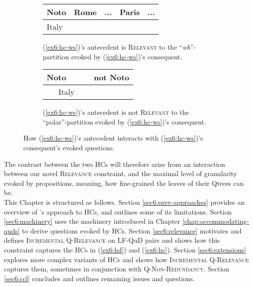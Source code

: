 \begin{figure}[H]
	\centering
	\begin{subfigure}[t]{.47\linewidth}
		\centering
		\begin{tabular}{|lll|ll}
			\hline
			\multicolumn{1}{|l|}{Noto} & \multicolumn{1}{l|}{Rome} & ... & \multicolumn{1}{l|}{Paris} & \multicolumn{1}{l|}{...} \\ \hline
			\multicolumn{3}{|l|}{\cellcolor{blue!20!white}Italy}                             & \multicolumn{2}{l}{}                                  \\ \cline{1-3}
		\end{tabular}
		\caption[]{(\ref{ex6:hc-ws})'s antecedent is \textsc{Relevant} to the ``\textit{wh}''-partition evoked by (\ref{ex6:hc-ws})'s consequent.}\label{tab:italy-not-noto-wh-rel1}
	\end{subfigure}
	\hfill
	\begin{subfigure}[t]{.47\linewidth}
		\centering
		\begin{tabular}{|lllll}
			\hline
			\multicolumn{1}{|l|}{Noto} & \multicolumn{4}{l|}{not Noto} \\ \hline
			\multicolumn{3}{|l|}{\cellcolor{blue!20!white}~~~Italy~~~}                &       &       \\ \cline{1-3}
		\end{tabular}
		\caption[]{(\ref{ex6:hc-ws})'s antecedent is not \textsc{Relevant} to the ``polar''-partition evoked by (\ref{ex6:hc-ws})'s consequent.}\label{tab:italy-not-noto-polar-rel1}
	\end{subfigure}
	\caption[]{How (\ref{ex6:hc-ws})'s antecedent interacts with (\ref{ex6:hc-ws})'s consequent's evoked questions.}
\end{figure}

The contrast between the two HCs will therefore arise from an interaction between our novel \textsc{Relevance} constraint, and the maximal level of granularity evoked by propositions, meaning, how fine-grained the leaves of their Qtrees can be.\\



This Chapter is structured as follows. Section \ref{sec6:prev-approaches} provides an overview of \citeauthor{Kalomoiros2024}'s approach to HCs, and outlines some of its limitations. Section \ref{sec6:machinery} uses the machinery introduced in Chapter \ref{chap:accommodating-quds} to derive questions evoked by HCs. Section \ref{sec6:relevance} motivates and defines \textsc{Incremental Q-Relevance} on LF-QuD pairs and shows how this constraint captures the HCs in (\ref{ex6:hd}) and (\ref{ex6:hc}). Section \ref{sec6:extensions} explores more complex variants of HCs and shows how \textsc{Incremental Q-Relevance} captures them, sometimes in conjunction with \textsc{Q-Non-Redundancy}. Section \ref{sec6:ccl} concludes and outlines remaining issues and questions.


